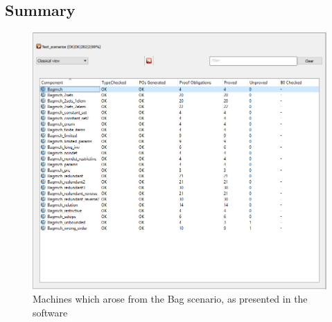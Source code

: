 \documentclass[11pt,journal]{IEEEtran}
\begin{document}
	\subsection{Summary}
\begin{figure}
	\centering
	\includegraphics[scale=0.8]{bagmchs.png}
	\caption{Machines which arose from the Bag scenario, as presented in the software}
\end{figure}
	
\end{document}
